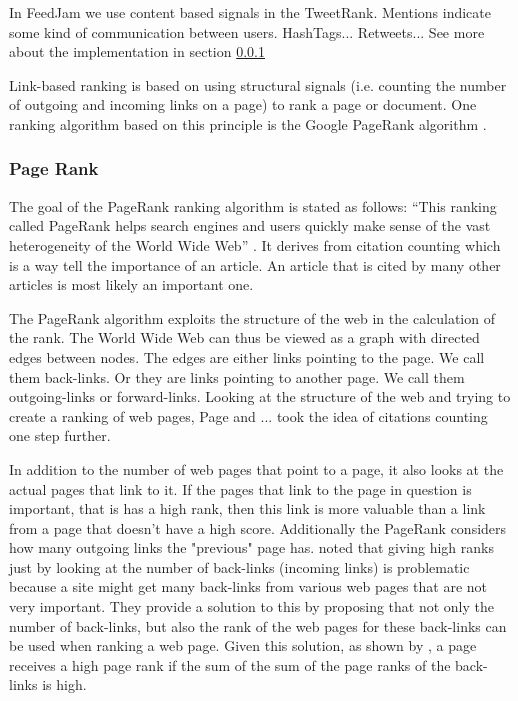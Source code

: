 In FeedJam we use content based signals in the TweetRank. Mentions indicate some kind of communication between users. %
HashTags...
Retweets...
 See more about the implementation in section \ref{} \nameref{}

Link-based ranking is based on using structural signals (i.e. counting the number of outgoing and incoming links on a page) to rank a page or document. One ranking algorithm based on this  principle is the Google PageRank algorithm \citep{Page1999}.

\subsubsection{Page Rank}
The goal of the PageRank ranking algorithm is stated as follows: “This ranking called PageRank helps search engines and users quickly make sense of the vast heterogeneity of the World Wide Web” \citep[p. 1]{Page1999}. It derives from citation counting which is a way tell the importance of an article. An article that is cited by many other articles is most likely an important one. 

The PageRank algorithm exploits the structure of the web in the calculation of the rank. The World Wide Web can thus be viewed as a graph with directed edges between nodes. The edges are either links pointing to the page. We call them back-links. Or they are links pointing to another page. We call them outgoing-links or forward-links. Looking at the structure of the web and trying to create a ranking of web pages, Page and ... \citet{} took the idea of citations counting one step further. 

In addition to the number of web pages that point to a page, it also looks at the actual pages that link to it. If the pages that link to the page in question is important, that is has a high rank, then this link is more valuable than a link from a page that doesn't have a high score. Additionally the PageRank considers how many outgoing links the "previous" page has. \citet{Page1999} noted that giving high ranks just by looking at the number of back-links (incoming links) is problematic because a site might get many back-links from various web pages that are not very important. They provide a solution to this by proposing that not only the number of back-links, but also the rank of the web pages for these back-links can be used when ranking a web page. Given this solution, as shown by \citet{Page1999}, a page receives a high page rank if the sum of the sum of the page ranks of the back-links is high.


